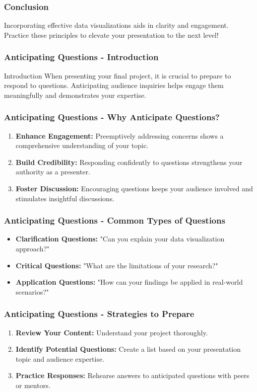 \documentclass[aspectratio=169]{beamer}
\begin{document}
\begin{frame}[fragile]
    \frametitle{Conclusion}
    Incorporating effective data visualizations aids in clarity and engagement. 
    Practice these principles to elevate your presentation to the next level!
\end{frame}

\begin{frame}[fragile]
    \frametitle{Anticipating Questions - Introduction}
    \begin{block}{Introduction}
        When presenting your final project, it is crucial to prepare to respond to questions. Anticipating audience inquiries helps engage them meaningfully and demonstrates your expertise.
    \end{block}
\end{frame}

\begin{frame}[fragile]
    \frametitle{Anticipating Questions - Why Anticipate Questions?}
    \begin{enumerate}
        \item \textbf{Enhance Engagement:} Preemptively addressing concerns shows a comprehensive understanding of your topic.
        \item \textbf{Build Credibility:} Responding confidently to questions strengthens your authority as a presenter.
        \item \textbf{Foster Discussion:} Encouraging questions keeps your audience involved and stimulates insightful discussions.
    \end{enumerate}
\end{frame}

\begin{frame}[fragile]
    \frametitle{Anticipating Questions - Common Types of Questions}
    \begin{itemize}
        \item \textbf{Clarification Questions:} "Can you explain your data visualization approach?"
        \item \textbf{Critical Questions:} "What are the limitations of your research?"
        \item \textbf{Application Questions:} "How can your findings be applied in real-world scenarios?"
    \end{itemize}
\end{frame}

\begin{frame}[fragile]
    \frametitle{Anticipating Questions - Strategies to Prepare}
    \begin{enumerate}
        \item \textbf{Review Your Content:} Understand your project thoroughly.
        \item \textbf{Identify Potential Questions:} Create a list based on your presentation topic and audience expertise.
        \item \textbf{Practice Responses:} Rehearse answers to anticipated questions with peers or mentors.
    \end{enumerate}
\end{frame}
\end{document}
